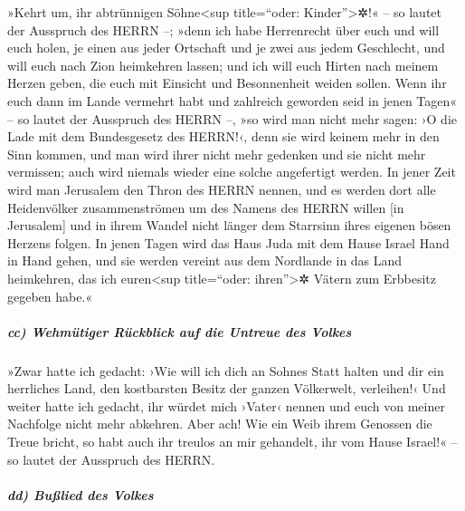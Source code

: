 »Kehrt um, ihr abtrünnigen Söhne\textless sup
title=``oder: Kinder''\textgreater✲!« -- so lautet der Ausspruch des
HERRN --; »denn ich habe Herrenrecht über euch und will euch holen, je
einen aus jeder Ortschaft und je zwei aus jedem Geschlecht, und will
euch nach Zion heimkehren lassen; und ich will euch
Hirten nach meinem Herzen geben, die euch mit Einsicht und Besonnenheit
weiden sollen. Wenn ihr euch dann im Lande vermehrt habt
und zahlreich geworden seid in jenen Tagen« -- so lautet der Ausspruch
des HERRN --, »so wird man nicht mehr sagen: ›O die Lade mit dem
Bundesgesetz des HERRN!‹, denn sie wird keinem mehr in den Sinn kommen,
und man wird ihrer nicht mehr gedenken und sie nicht mehr vermissen;
auch wird niemals wieder eine solche angefertigt werden.
In jener Zeit wird man Jerusalem den Thron des HERRN
nennen, und es werden dort alle Heidenvölker zusammenströmen um des
Namens des HERRN willen {[}in Jerusalem{]} und in ihrem Wandel nicht
länger dem Starrsinn ihres eigenen bösen Herzens folgen.
In jenen Tagen wird das Haus Juda mit dem Hause Israel
Hand in Hand gehen, und sie werden vereint aus dem Nordlande in das Land
heimkehren, das ich euren\textless sup title=``oder:
ihren''\textgreater✲ Vätern zum Erbbesitz gegeben habe.«

\hypertarget{cc-wehmuxfctiger-ruxfcckblick-auf-die-untreue-des-volkes}{%
\subparagraph{cc) Wehmütiger Rückblick auf die Untreue des
Volkes}\label{cc-wehmuxfctiger-ruxfcckblick-auf-die-untreue-des-volkes}}

»Zwar hatte ich gedacht: ›Wie will ich dich an Sohnes
Statt halten und dir ein herrliches Land, den kostbarsten Besitz der
ganzen Völkerwelt, verleihen!‹ Und weiter hatte ich gedacht, ihr würdet
mich ›Vater‹ nennen und euch von meiner Nachfolge nicht mehr abkehren.
Aber ach! Wie ein Weib ihrem Genossen die Treue bricht,
so habt auch ihr treulos an mir gehandelt, ihr vom Hause Israel!« -- so
lautet der Ausspruch des HERRN.

\hypertarget{dd-buuxdflied-des-volkes}{%
\subparagraph{dd) Bußlied des Volkes}\label{dd-buuxdflied-des-volkes}}


